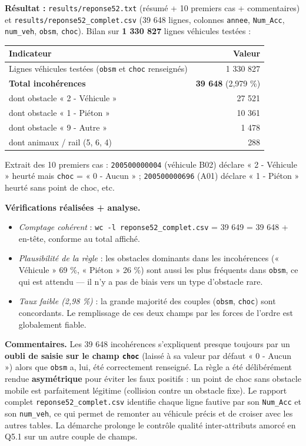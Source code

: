 \documentclass[11pt,a4paper]{article}
\newcommand{\rub}[2]{\textbf{\textcolor{#1}{#2}}}
\begin{document}
\rub{labresultat}{Résultat :} \texttt{results/reponse52.txt} (résumé + 10 premiers cas + commentaires) et \texttt{results/reponse52\_complet.csv} (39 648 lignes, colonnes \texttt{annee}, \texttt{Num\_Acc}, \texttt{num\_veh}, \texttt{obsm}, \texttt{choc}). Bilan sur \textbf{1 330 827} lignes véhicules testées :

\begin{center}
\begin{tabular}{l r}
\hline
\textbf{Indicateur} & \textbf{Valeur} \\
\hline
Lignes véhicules testées (\texttt{obsm} et \texttt{choc} renseignés) & 1 330 827 \\
\textbf{Total incohérences} & \textbf{39 648} (2,979 \%) \\
dont obstacle « 2 - Véhicule » & 27 521 \\
dont obstacle « 1 - Piéton » & 10 361 \\
dont obstacle « 9 - Autre » & 1 478 \\
dont animaux / rail (5, 6, 4) & 288 \\
\hline
\end{tabular}
\end{center}

Extrait des 10 premiers cas : \texttt{200500000004} (véhicule B02) déclare « 2 - Véhicule » heurté mais \texttt{choc} = « 0 - Aucun » ; \texttt{200500000696} (A01) déclare « 1 - Piéton » heurté sans point de choc, etc.

\rub{labanalyse}{Vérifications réalisées + analyse.}

\begin{itemize}
\item \emph{Comptage cohérent} : \texttt{wc -l reponse52\_complet.csv} = 39 649 = 39 648 + en-tête, conforme au total affiché.
\item \emph{Plausibilité de la règle} : les obstacles dominants dans les incohérences (« Véhicule » 69 \%, « Piéton » 26 \%) sont aussi les plus fréquents dans \texttt{obsm}, ce qui est attendu — il n'y a pas de biais vers un type d'obstacle rare.
\item \emph{Taux faible (2,98 \%)} : la grande majorité des couples (\texttt{obsm}, \texttt{choc}) sont concordants. Le remplissage de ces deux champs par les forces de l'ordre est globalement fiable.
\end{itemize}

\rub{labcomment}{Commentaires.} Les 39 648 incohérences s'expliquent presque toujours par un \textbf{oubli de saisie sur le champ \texttt{choc}} (laissé à sa valeur par défaut « 0 - Aucun ») alors que \texttt{obsm} a, lui, été correctement renseigné. La règle a été délibérément rendue \textbf{asymétrique} pour éviter les faux positifs : un point de choc sans obstacle mobile est parfaitement légitime (collision contre un obstacle fixe). Le rapport complet \texttt{reponse52\_complet.csv} identifie chaque ligne fautive par son \texttt{Num\_Acc} et son \texttt{num\_veh}, ce qui permet de remonter au véhicule précis et de croiser avec les autres tables. La démarche prolonge le contrôle qualité inter-attributs amorcé en Q5.1 sur un autre couple de champs.
\end{document}
